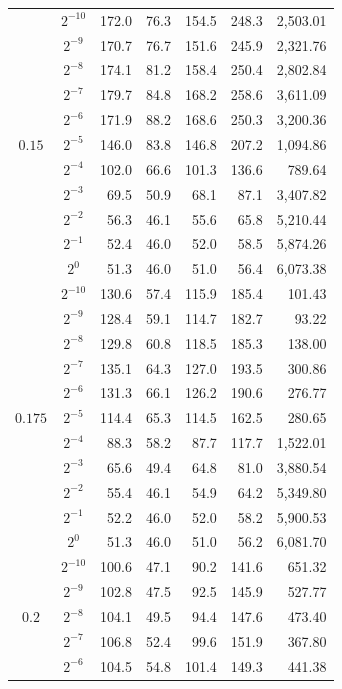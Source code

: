 \begin{table}[H]
\begin{tabular}{ccrrrrr}
\midrule
\multirow{11}{*}{$ 0.15 $} & $2^{-10}$ & 172.0 & 76.3 & 154.5 & 248.3 & 2,503.01 \\
 & $2^{-9}$ & 170.7 & 76.7 & 151.6 & 245.9 & 2,321.76 \\
 & $2^{-8}$ & 174.1 & 81.2 & 158.4 & 250.4 & 2,802.84 \\
 & $2^{-7}$ & 179.7 & 84.8 & 168.2 & 258.6 & 3,611.09 \\
 & $2^{-6}$ & 171.9 & 88.2 & 168.6 & 250.3 & 3,200.36 \\
 & $2^{-5}$ & 146.0 & 83.8 & 146.8 & 207.2 & 1,094.86 \\
 & $2^{-4}$ & 102.0 & 66.6 & 101.3 & 136.6 & 789.64 \\
 & $2^{-3}$ & 69.5 & 50.9 & 68.1 & 87.1 & 3,407.82 \\
 & $2^{-2}$ & 56.3 & 46.1 & 55.6 & 65.8 & 5,210.44 \\
 & $2^{-1}$ & 52.4 & 46.0 & 52.0 & 58.5 & 5,874.26 \\
 & $2^{0}$ & 51.3 & 46.0 & 51.0 & 56.4 & 6,073.38 \\
\midrule
\multirow{11}{*}{$ 0.175 $} & $2^{-10}$ & 130.6 & 57.4 & 115.9 & 185.4 & 101.43 \\
 & $2^{-9}$ & 128.4 & 59.1 & 114.7 & 182.7 & 93.22 \\
 & $2^{-8}$ & 129.8 & 60.8 & 118.5 & 185.3 & 138.00 \\
 & $2^{-7}$ & 135.1 & 64.3 & 127.0 & 193.5 & 300.86 \\
 & $2^{-6}$ & 131.3 & 66.1 & 126.2 & 190.6 & 276.77 \\
 & $2^{-5}$ & 114.4 & 65.3 & 114.5 & 162.5 & 280.65 \\
 & $2^{-4}$ & 88.3 & 58.2 & 87.7 & 117.7 & 1,522.01 \\
 & $2^{-3}$ & 65.6 & 49.4 & 64.8 & 81.0 & 3,880.54 \\
 & $2^{-2}$ & 55.4 & 46.1 & 54.9 & 64.2 & 5,349.80 \\
 & $2^{-1}$ & 52.2 & 46.0 & 52.0 & 58.2 & 5,900.53 \\
 & $2^{0}$ & 51.3 & 46.0 & 51.0 & 56.2 & 6,081.70 \\
\midrule
\multirow{11}{*}{$ 0.2 $} & $2^{-10}$ & 100.6 & 47.1 & 90.2 & 141.6 & 651.32 \\
 & $2^{-9}$ & 102.8 & 47.5 & 92.5 & 145.9 & 527.77 \\
 & $2^{-8}$ & 104.1 & 49.5 & 94.4 & 147.6 & 473.40 \\
 & $2^{-7}$ & 106.8 & 52.4 & 99.6 & 151.9 & 367.80 \\
 & $2^{-6}$ & 104.5 & 54.8 & 101.4 & 149.3 & 441.38 \\

\end{tabular}
\end{table}
